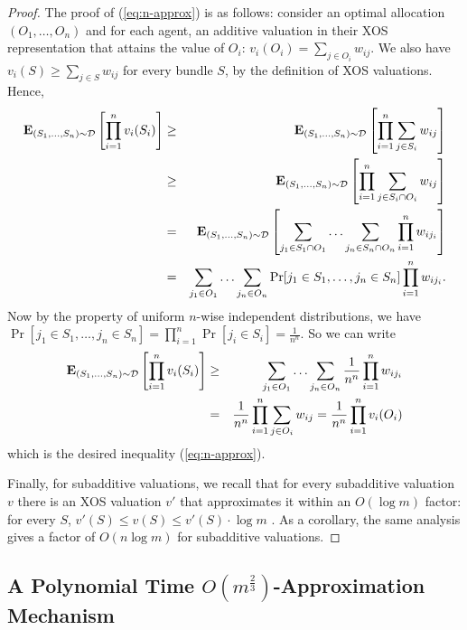 \documentclass{theoretics}
\newcommand{\E}{\mbox{\bf E}}
\newcommand{\cD}{{\mathcal D}}
\begin{document}
\begin{proof}
The proof of (\ref{eq:n-approx}) is as follows: consider an optimal allocation $(O_1,\ldots,O_n)$ and for each agent, an additive valuation in their XOS representation that attains the value of $O_i$:  $v_i(O_i) = \sum_{j \in O_i} w_{ij}$. We also have 
$v_i(S) \geq \sum_{j \in S} w_{ij}$ for every bundle $S$, by the definition of XOS valuations. Hence,
\begin{eqnarray*}
\E_{(S_1,\ldots,S_n) \sim \cD}\left[\prod_{i=1}^{n} v_i(S_i) \right] 
& \geq & \E_{(S_1,\ldots,S_n) \sim \cD}\left[\prod_{i=1}^{n} \sum_{j \in S_i} w_{ij} \right]  \\
& \geq & \E_{(S_1,\ldots,S_n) \sim \cD}\left[\prod_{i=1}^{n} \sum_{j \in S_i \cap O_i} w_{ij} \right]  \\
& = & \E_{(S_1,\ldots,S_n) \sim \cD}\left[\sum_{j_1 \in S_1 \cap O_1} \ldots \sum_{j_n \in S_n \cap O_n} \prod_{i=1}^{n} w_{i j_i} \right]  \\
& = & \sum_{j_1 \in O_1} \ldots \sum_{j_n \in O_n} \Pr[j_1 \in S_1, \ldots, j_n \in S_n] \prod_{i=1}^{n} w_{i j_i}.  \\
\end{eqnarray*}
Now by the property of uniform $n$-wise independent distributions, we have $\Pr[j_1 \in S_1, \ldots, j_n \in S_n] = \prod_{i=1}^{n} \Pr[j_i \in S_i] = \frac{1}{n^n}$. So we can write
\begin{eqnarray*}
\E_{(S_1,\ldots,S_n) \sim \cD}\left[\prod_{i=1}^{n} v_i(S_i) \right] 
& \geq & \sum_{j_1 \in O_1} \ldots \sum_{j_n \in O_n} \frac{1}{n^n} \prod_{i=1}^{n} w_{i j_i} \\
& = & \frac{1}{n^n} \prod_{i=1}^{n} \sum_{j \in O_i} w_{ij} = \frac{1}{n^n} \prod_{i=1}^{n} v_i(O_i)
\end{eqnarray*}
which is the desired inequality (\ref{eq:n-approx}).

Finally, for subadditive valuations, we recall that for every subadditive valuation $v$ there is an XOS valuation $v'$ that approximates it within an $O(\log m)$ factor: for every $S$, $v'(S)\leq v(S)\leq v'(S) \cdot \log m$ \cite{D07}. As a corollary, the same analysis gives a factor of $O(n \log m)$ for subadditive valuations.
\end{proof}



\subsection{A Polynomial Time \texorpdfstring{$O(m^{\frac 2 3})$}{O(m\^{}(2/3))}-Approximation Mechanism}\label{subsec-approx-m23}
\end{document}
